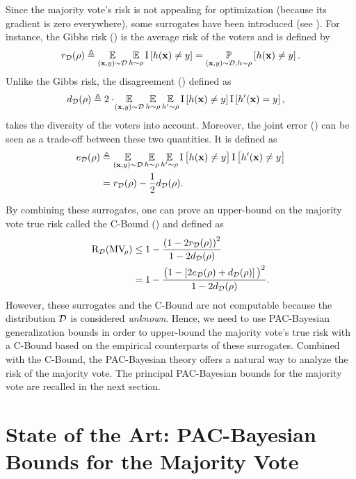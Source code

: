 Since the majority vote's risk is not appealing for optimization (because its gradient is zero everywhere), some surrogates have been introduced (see ).
For instance, the Gibbs risk () is the average risk of the voters and is  defined by
\begin{align*}
r_{\mathcal{D}}(\rho) \triangleq \operatorname*{\mathbb{E}}_{(\mathbf{x},y)\sim\mathcal{D}}   \operatorname*{\mathbb{E}}_{h\sim \rho} \operatorname{I}\left[h(\mathbf{x}) \ne y\right] = \operatorname*{\mathbb{P}}_{(\mathbf{x},y)\sim\mathcal{D}, h\sim\rho}\left[ h(\mathbf{x}) \ne y \right].
\end{align*}
Unlike the Gibbs risk, the disagreement () defined as
\begin{align*}
    d_{\mathcal{D}}(\rho) &\triangleq 2\cdot\!  \operatorname*{\mathbb{E}}_{(\mathbf{x},y)\sim\mathcal{D}}\operatorname*{\mathbb{E}}_{h\sim\rho}\operatorname*{\mathbb{E}}_{h'\sim\rho}\operatorname{I}\left[ h(\mathbf{x})\ne y\right]\operatorname{I}\left[ h'(\mathbf{x})=y\right],
\end{align*}
takes the diversity of the voters into account.
Moreover, the joint error () can be seen as a trade-off between these two quantities.
It is defined as
\begin{align*}
e_{\mathcal{D}}(\rho) &\triangleq \operatorname*{\mathbb{E}}_{(\mathbf{x},y)\sim\mathcal{D}} \operatorname*{\mathbb{E}}_{h\sim\rho}\operatorname*{\mathbb{E}}_{h'\sim\rho}
     \operatorname{I}\left[h(\mathbf{x}) \ne y\big]\operatorname{I}\big[h'(\mathbf{x}) \ne y\right]\\
     &= r_{\mathcal{D}}(\rho)-\frac{1}{2}d_{\mathcal{D}}(\rho).
\end{align*}

By combining these surrogates, one can prove an upper-bound on the majority vote true risk called the C-Bound () and defined as
\begin{align*}
\text{R}_{\mathcal{D}}(\text{MV}_{\!\rho}) &\le 1-\frac{\left(1-2r_{\mathcal{D}}(\rho)\right)^2}{1-2d_{\mathcal{D}}(\rho)}\\
&= 1-\frac{\big(1-\left[2e_{\mathcal{D}}(\rho)+d_{\mathcal{D}}(\rho)\right]\big)^2}{1-2d_{\mathcal{D}}(\rho)}.
\end{align*}
However, these surrogates and the C-Bound are not computable because the distribution $\mathcal{D}$ is considered {\it unknown}.
Hence, we need to use PAC-Bayesian generalization bounds in order to upper-bound the majority vote's true risk with a C-Bound based on the empirical counterparts of these surrogates.
Combined with the C-Bound, the PAC-Bayesian theory offers a natural way to analyze the risk of the majority vote.
The principal PAC-Bayesian bounds for the majority vote are recalled in the next section.

\section{State of the Art: PAC-Bayesian Bounds for the Majority Vote}
\label{chap:mv:sec:pb}

